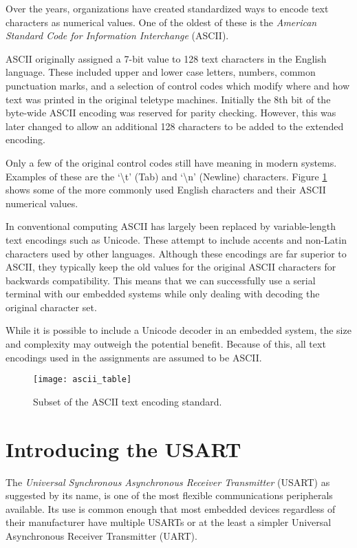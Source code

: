 \documentclass[11pt,fleqn]{book} %
\begin{document}
Over the years, organizations have created standardized ways to encode text characters as numerical values. One of the oldest of these is the \textit{American Standard Code for Information Interchange} (ASCII). 

ASCII originally assigned a 7-bit value to 128 text characters in the English language. These included upper and lower case letters, numbers, common punctuation marks, and a selection of control codes which modify where and how text was printed in the original teletype machines. Initially the 8th bit of the byte-wide ASCII encoding was reserved for parity checking. However, this was later changed to allow an additional 128 characters to be added to the extended encoding. 

Only a few of the original control codes still have meaning in modern systems. Examples of these are the `\textbackslash{}t' (Tab) and `\textbackslash{}n' (Newline) characters. Figure \ref{ascii_table} shows some of the more commonly used English characters and their ASCII numerical values.  

In conventional computing ASCII has largely been replaced by variable-length text encodings such as Unicode. These attempt to include accents and non-Latin characters used by other languages. Although these encodings are far superior to ASCII, they typically keep the old values for the original ASCII characters for backwards compatibility. This means that we can successfully use a serial terminal with our embedded systems while only dealing with decoding the original character set.

While it is possible to include a Unicode decoder in an embedded system, the size and complexity may outweigh the potential benefit. Because of this, all text encodings used in the assignments are assumed to be ASCII.

\begin{figure}[]
    \centering\texttt{[image: ascii\_table]}
    \caption{Subset of the ASCII text encoding standard.}
    \label{ascii_table}
\end{figure}


\section{Introducing the USART}

The \textit{Universal Synchronous Asynchronous Receiver Transmitter} (USART) as suggested by its name, is one of the most flexible communications peripherals available. Its use is common enough that most embedded devices regardless of their manufacturer have multiple USARTs or at the least a simpler Universal Asynchronous Receiver Transmitter (UART).
\end{document}

